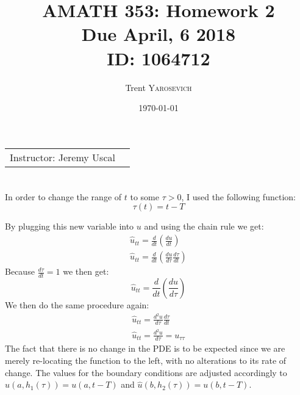 \documentclass{article}
\title{AMATH 353: Homework 2 \\Due April, 6 2018 \\ ID: 1064712} %
\author{Trent \textsc{Yarosevich}} %
\date{\today} %
\begin{document}
\maketitle %
\setlength\parindent{1cm}

\begin{center}
\begin{tabular}{l r}
Instructor: Jeremy Uscal %
\end{tabular}
\end{center}


\section*{} 
	In order to change the range of $t$ to some $\tau > 0$, I used the following function: 
\begin{equation}
\tau(t) = t - T
\end{equation}

\noindent By plugging this new variable into $u$ and using the chain rule we get: 
\begin{equation}
\begin{aligned}
\hat{u}_{tt} = \frac{d}{dt}(\frac{du}{dt})\\
\hat{u}_{tt} = \frac{d}{dt}(\frac{du}{d\tau}\frac{d\tau}{dt})
\end{aligned}
\end{equation}
Because $\frac{d\tau}{dt} = 1$ we then get:
\begin{equation}
\hat{u}_{tt} = \frac{d}{dt}(\frac{du}{d\tau})
\end{equation}
We then do the same procedure again:
\begin{equation}
\begin{aligned}
\hat{u}_{tt} = \frac{d^2u}{d\tau}\frac{d\tau}{dt}\\
\hat{u}_{tt} = \frac{d^2u}{d\tau} = u_{\tau\tau}
\end{aligned}
\end{equation}
The fact that there is no change in the PDE is to be expected since we are merely re-locating the function to the left, with no alterations to its rate of change. The values for the boundary conditions are adjusted accordingly to $\hat{u}(a, h_1(\tau)) = u(a, t - T)$ and $\hat{u}(b, h_2(\tau)) = u(b, t - T)$.
\end{document}
